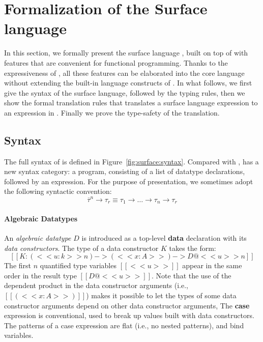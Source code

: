 \newcommand{\FV}{\mathsf{FV}}
\newcommand{\dom}{\mathsf{dom}}

\section{Formalization of the Surface language}
\label{sec:surface}


In this section, we formally present the surface language \sufcc,
built on top of \name with features that are convenient for functional
programming. Thanks to the expressiveness of \name, all these features
can be elaborated into the core language without extending the
built-in language constructs of \name. In what follows, we first give
the syntax of the surface language, followed by the typing rules, then
we show the formal translation rules that translates a surface
language expression to an expression in \name. Finally we prove the
type-safety of the translation.

\subsection{Syntax}

The full syntax of \sufcc is defined in
Figure~\ref{fig:surface:syntax}. Compared with \name, \sufcc has a new
syntax category: a program, consisting of a list of datatype
declarations, followed by an expression. For the purpose of
presentation, we sometimes adopt the following syntactic convention:
\[
\overline{\tau}^n \rightarrow \tau_r \equiv \tau_1 \rightarrow \dots \rightarrow \tau_n \rightarrow \tau_r
\]

\paragraph{Algebraic Datatypes}
An \emph{algebraic datatype} $D$ is introduced as a top-level
\textbf{data} declaration with its \emph{data constructors}. The type
of a data constructor $K$ takes the form:
\[
[[K : (<<u:k>>n) -> (<<x : A>>) -> D@<<u>>n]]
\]
The first $n$ quantified type variables $[[<<u>>]]$ appear in the same
order in the result type $[[D@<<u>>]]$.  Note that the use of the
dependent product in the data constructor arguments (i.e.,
$[[(<<x:A>>)]]$) makes it possible to let the types of some data
constructor arguments depend on other data constructor arguments,
The \textbf{case} expression is conventional, used to break up values
built with data constructors.  The patterns of a case expression are
flat (i.e., no nested patterns), and bind variables.


